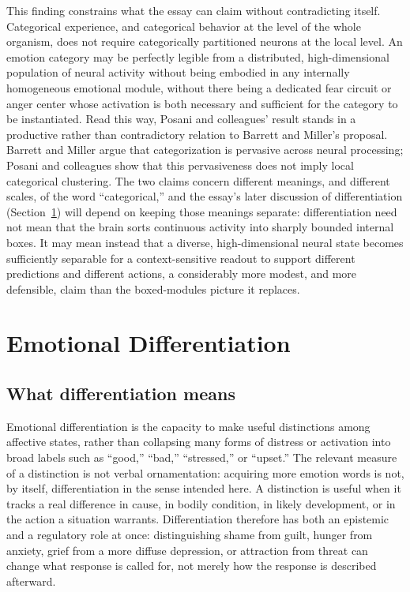 \documentclass[11pt]{article}
\begin{document}
This finding constrains what the essay can claim without contradicting itself. Categorical experience, and categorical behavior at the level of the whole organism, does not require categorically partitioned neurons at the local level. An emotion category may be perfectly legible from a distributed, high-dimensional population of neural activity without being embodied in any internally homogeneous emotional module, without there being a dedicated fear circuit or anger center whose activation is both necessary and sufficient for the category to be instantiated. Read this way, Posani and colleagues' result stands in a productive rather than contradictory relation to Barrett and Miller's proposal. Barrett and Miller argue that categorization is pervasive across neural processing; Posani and colleagues show that this pervasiveness does not imply local categorical clustering. The two claims concern different meanings, and different scales, of the word ``categorical,'' and the essay's later discussion of differentiation (Section~\ref{sec:differentiation}) will depend on keeping those meanings separate: differentiation need not mean that the brain sorts continuous activity into sharply bounded internal boxes. It may mean instead that a diverse, high-dimensional neural state becomes sufficiently separable for a context-sensitive readout to support different predictions and different actions, a considerably more modest, and more defensible, claim than the boxed-modules picture it replaces.

\section{Emotional Differentiation}\label{sec:differentiation}

\subsection{What differentiation means}\label{sub:means}

Emotional differentiation is the capacity to make useful distinctions among affective states, rather than collapsing many forms of distress or activation into broad labels such as ``good,'' ``bad,'' ``stressed,'' or ``upset.'' The relevant measure of a distinction is not verbal ornamentation: acquiring more emotion words is not, by itself, differentiation in the sense intended here. A distinction is useful when it tracks a real difference in cause, in bodily condition, in likely development, or in the action a situation warrants. Differentiation therefore has both an epistemic and a regulatory role at once: distinguishing shame from guilt, hunger from anxiety, grief from a more diffuse depression, or attraction from threat can change what response is called for, not merely how the response is described afterward.
\end{document}
